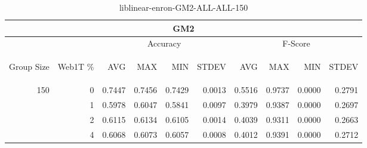 \begin{center}
\begin{table}[htbp]
\begin{tabular}{ | r | r | r | r | r | r | r | r | r | r |}
\hline
\multicolumn{10}{|c|}{GM2}\\
\hline
 & & \multicolumn{4}{|c|}{Accuracy} & \multicolumn{4}{|c|}{F-Score}\\ \cline{3-10}
\begin{sideways}Group Size\end{sideways} & \begin{sideways}Web1T \%\end{sideways} & \begin{sideways}AVG\end{sideways} & \begin{sideways}MAX\end{sideways} & \begin{sideways}MIN\end{sideways} & \begin{sideways}STDEV\end{sideways} & \begin{sideways}AVG\end{sideways} & \begin{sideways}MAX\end{sideways} & \begin{sideways}MIN\end{sideways} & \begin{sideways}STDEV\end{sideways}\\
\hline
\multirow{4}{*}{150}
 & 0 & 0.7447 & 0.7456 & 0.7429 & 0.0013 & 0.5516 & 0.9737 & 0.0000 & 0.2791\\ \cline{2-10}
 & 1 & 0.5978 & 0.6047 & 0.5841 & 0.0097 & 0.3979 & 0.9387 & 0.0000 & 0.2697\\ \cline{2-10}
 & 2 & 0.6115 & 0.6134 & 0.6105 & 0.0014 & 0.4039 & 0.9311 & 0.0000 & 0.2663\\ \cline{2-10}
 & 4 & 0.6068 & 0.6073 & 0.6057 & 0.0008 & 0.4012 & 0.9391 & 0.0000 & 0.2712\\ \cline{2-10}
\hline
\end{tabular}
\caption{liblinear-enron-GM2-ALL-ALL-150}
\end{table}
\end{center}

